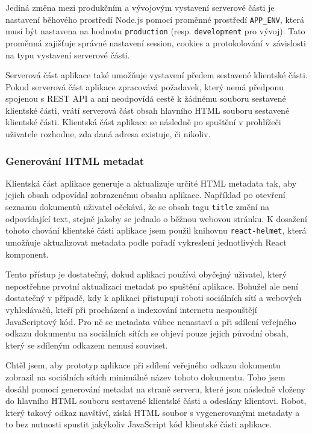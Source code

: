 Jediná změna mezi produkčním a vývojovým vystavení serverové části je nastavení běhového prostředí Node.js pomocí proměnné prostředí \texttt{APP\_ENV}, která musí být nastavena na hodnotu \texttt{production} (resp. \texttt{development} pro vývoj).
Tato proměnná zajišťuje správné nastavení session, cookies a protokolování v závislosti na typu vystavení serverové části.

Serverová část aplikace také umožňuje vystavení předem sestavené klientské části.
Pokud serverová část aplikace zpracovává požadavek, který nemá předponu spojenou s \gls{REST} \gls{API} a ani neodpovídá cestě k žádnému souboru sestavené klientské části, vrátí serverová část obsah hlavního \gls{HTML} souboru sestavené klientské části.
Klientská část aplikace se následně po spuštění v prohlížeči uživatele rozhodne, zda daná adresa existuje, či nikoliv.

\subsubsection{Generování HTML metadat}

Klientská část aplikace generuje a aktualizuje určité \gls{HTML} metadata tak, aby jejich obsah odpovídal zobrazenému obsahu aplikace.
Například po otevření seznamu dokumentů uživatel očekává, že se obsah tagu \texttt{title} změní na odpovídající text, stejně jakoby se jednalo o běžnou webovou stránku.
K dosažení tohoto chování klientské části aplikace jsem použil knihovnu \texttt{react-helmet}, která umožňuje aktualizovat metadata podle pořadí vykreslení jednotlivých React komponent.

Tento přístup je dostatečný, dokud aplikaci používá obyčejný uživatel, který nepostřehne prvotní aktualizaci metadat po spuštění aplikace.
Bohužel ale není dostatečný v případě, kdy k aplikaci přistupují roboti sociálních sítí a webových vyhledávačů, kteří při procházení a indexování internetu nespouštějí JavaScriptový kód.
Pro ně se metadata vůbec nenastaví a při sdílení veřejného odkazu dokumentu na sociálních sítích se objeví pouze jejich původní obsah, který se sdíleným odkazem nemusí souviset.

Chtěl jsem, aby prototyp aplikace při sdílení veřejného odkazu dokumentu zobrazil na sociálních sítích minimálně název tohoto dokumentu.
Toho jsem dosáhl pomocí generování metadat na straně serveru, které jsou následně vloženy do hlavního \gls{HTML} souboru sestavené klientské části a odeslány klientovi.
Robot, který takový odkaz navštíví, získá \gls{HTML} soubor s vygenerovanými metadaty a to bez nutnosti spustit jakýkoliv JavaScript kód klientské části aplikace.

